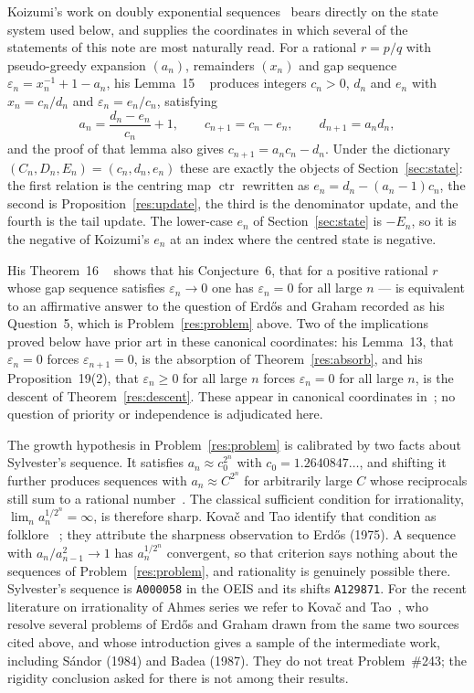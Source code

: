 \documentclass[11pt]{article}
\newcommand{\ctr}{\operatorname{ctr}}
\begin{document}
Koizumi's work on doubly exponential sequences~\cite{koizumi2025} bears
directly on the state system used below, and supplies the coordinates in which
several of the statements of this note are most naturally read.  For a rational
$r=p/q$ with pseudo-greedy expansion $(a_n)$, remainders $(x_n)$ and gap
sequence $\varepsilon_n=x_n^{-1}+1-a_n$, his Lemma~15
~\cite[p.~9]{koizumi2025} produces integers $c_n>0$,
$d_n$ and $e_n$ with $x_n=c_n/d_n$ and $\varepsilon_n=e_n/c_n$, satisfying
\[
 a_n=\frac{d_n-e_n}{c_n}+1,\qquad
 c_{n+1}=c_n-e_n,\qquad
 d_{n+1}=a_nd_n ,
\]
and the proof of that lemma also gives $c_{n+1}=a_nc_n-d_n$.  Under the
dictionary $(C_n,D_n,E_n)=(c_n,d_n,e_n)$ these are exactly the objects of
Section~\ref{sec:state}: the first relation is the centring map $\ctr$ rewritten
as $e_n=d_n-(a_n-1)c_n$, the second is Proposition~\ref{res:update}, the third
is the denominator update, and the fourth is the tail update.  The lower-case
$e_n$ of Section~\ref{sec:state} is $-E_n$, so it is the negative of Koizumi's
$e_n$ at an index where the centred state is negative.

His Theorem~16
~\cite[p.~11]{koizumi2025} shows
that his Conjecture~6, that for a positive rational $r$ whose gap sequence
satisfies $\varepsilon_n\to0$ one has $\varepsilon_n=0$ for all large $n$ ---
is equivalent to an affirmative answer to the question of Erd\H{o}s and Graham
recorded as his Question~5, which is Problem~\ref{res:problem} above.
Two of the implications proved below have prior art in these canonical
coordinates: his Lemma~13, that $\varepsilon_n=0$ forces $\varepsilon_{n+1}=0$,
is the absorption of Theorem~\ref{res:absorb}, and his Proposition~19(2), that
$\varepsilon_n\ge0$ for all large $n$ forces $\varepsilon_n=0$ for all large
$n$, is the descent of Theorem~\ref{res:descent}.  These appear in canonical
coordinates in~\cite[Lemma~13, p.~9; Prop.~19(2), p.~12]{koizumi2025}; no
question of priority or independence is
adjudicated here.

The growth hypothesis in Problem~\ref{res:problem} is calibrated by two facts
about Sylvester's sequence.  It satisfies $a_n\approx c_0^{2^{n}}$ with
$c_0=1.2640847\ldots$, and shifting it further produces sequences with
$a_n\approx C^{2^{n}}$ for arbitrarily large $C$ whose reciprocals still sum
to a rational number~\cite[arXiv v4, p.~2]{kovactao2024}.  The classical sufficient
condition for irrationality, $\lim_n a_n^{1/2^{n}}=\infty$, is therefore
sharp.  Kova\v{c} and Tao identify that condition as folklore
~\cite[arXiv v4, p.~2]{kovactao2024}; they attribute the sharpness observation to
Erd\H{o}s (1975).  A sequence with
$a_n/a_{n-1}^{2}\to1$ has $a_n^{1/2^{n}}$
convergent, so that criterion says nothing about the sequences of
Problem~\ref{res:problem}, and rationality is genuinely possible there.
Sylvester's
sequence is \texttt{A000058} in the OEIS and its shifts \texttt{A129871}.  For
the recent literature on irrationality of Ahmes series we refer to Kova\v{c}
and Tao~\cite{kovactao2024}, who resolve several problems of Erd\H{o}s and
Graham drawn from the same two sources cited above, and whose introduction
gives a sample of the intermediate work, including S\'andor (1984) and Badea
(1987).  They do not treat Problem~\#243; the rigidity conclusion asked for
there is not among their results.
\end{document}
